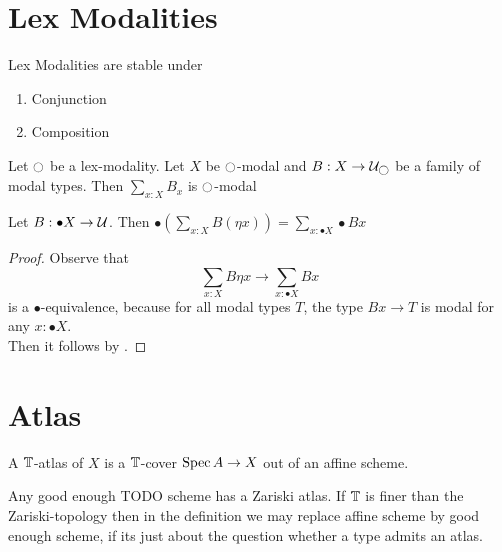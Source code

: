 \documentclass{article}
\begin{document}
\section{Lex Modalities}
\begin{lemma}{\label{lemma:LexStability}}
Lex Modalities are stable under 
\begin{enumerate}
    \item Conjunction
    \item Composition
\end{enumerate}
    
\end{lemma}
\begin{lemma}{\label{lemma:LexSumStable}}
    Let $\ci$ be a lex-modality. Let $X$ be $\ci$-modal and $B : X \to \cU_{\ci}$ be a family of modal types. Then $\sum_{x : X} B_x$ is $\ci$-modal
\end{lemma}
\begin{lemma}{\label{lemma:mod_comm_sum}}
    Let $B  : \bullet X \to \mathcal{U}$. Then $\bullet (\sum_{x : X} B (\eta x)) = \sum_{x : \bullet X} \bullet B x$
\end{lemma}
\begin{proof}
    Observe that 
    \[
    \sum_{x : X} B \eta x \to \sum_{x : \bullet X} B x
    \]
    is a $\bullet$-equivalence, because for all modal types $T$, the type $B x \to T$ is modal for any $x : \bullet X$. \\
    Then it follows by \todocite.
\end{proof}
\section{Atlas}
\begin{definition}
    A $\mathbb{T}$-atlas of $X$ is a $\mathbb{T}$-cover $\operatorname{Spec} A \to X$ out of an affine scheme.
\end{definition}
\begin{rmk}{\label{rmk:defatlas}}
    Any good enough TODO scheme has a Zariski atlas. If $\mathbb{T}$ is finer than the Zariski-topology then in the definition we may replace affine scheme by good enough scheme, if its just about the question whether a type admits an atlas.
\end{rmk}
\end{document}
